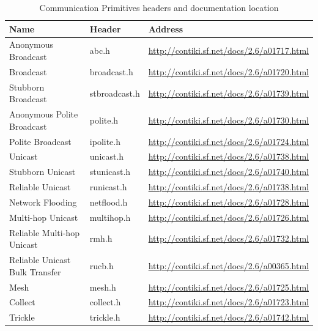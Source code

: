 \begin{table}[H]
	\centering
	\begin{tabular}{ | l | l | l | }
		\hline
		Name & Header & Address \\
		\hline
		Anonymous Broadcast & abc.h & \url{http://contiki.sf.net/docs/2.6/a01717.html} \\
		Broadcast & broadcast.h & \url{http://contiki.sf.net/docs/2.6/a01720.html} \\
		Stubborn Broadcast & stbroadcast.h & \url{http://contiki.sf.net/docs/2.6/a01739.html} \\
		Anonymous Polite Broadcast & polite.h & \url{http://contiki.sf.net/docs/2.6/a01730.html} \\
		Polite Broadcast & ipolite.h & \url{http://contiki.sf.net/docs/2.6/a01724.html} \\
		Unicast & unicast.h & \url{http://contiki.sf.net/docs/2.6/a01738.html} \\
		Stubborn Unicast & stunicast.h & \url{http://contiki.sf.net/docs/2.6/a01740.html} \\
		Reliable Unicast & runicast.h & \url{http://contiki.sf.net/docs/2.6/a01738.html} \\
		Network Flooding & netflood.h & \url{http://contiki.sf.net/docs/2.6/a01728.html} \\
		Multi-hop Unicast & multihop.h & \url{http://contiki.sf.net/docs/2.6/a01726.html} \\
		Reliable Multi-hop Unicast & rmh.h & \url{http://contiki.sf.net/docs/2.6/a01732.html} \\
		Reliable Unicast Bulk Transfer & rucb.h& \url{http://contiki.sf.net/docs/2.6/a00365.html} \\
		\hline
		\hline
		Mesh & mesh.h & \url{http://contiki.sf.net/docs/2.6/a01725.html} \\
		Collect & collect.h & \url{http://contiki.sf.net/docs/2.6/a01723.html} \\
		Trickle & trickle.h & \url{http://contiki.sf.net/docs/2.6/a01742.html} \\
		\hline
	\end{tabular}
	\caption{Communication Primitives headers and documentation location}
\end{table}

